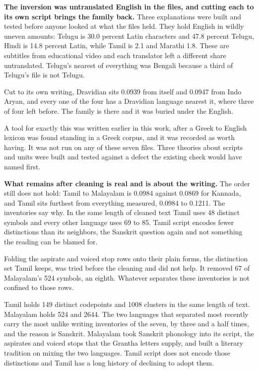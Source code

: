 \textbf{The inversion was untranslated English in the files, and cutting each to its own script brings the family back.} Three explanations were built and tested before anyone looked at what the files held. They hold English in wildly uneven amounts: Telugu is 30.0 percent Latin characters and 47.8 percent Telugu, Hindi is 14.8 percent Latin, while Tamil is 2.1 and Marathi 1.8. These are subtitles from educational video and each translator left a different share untranslated. Telugu's nearest of everything was Bengali because a third of Telugu's file is not Telugu.

Cut to its own writing, Dravidian sits 0.0939 from itself and 0.0947 from Indo Aryan, and every one of the four has a Dravidian language nearest it, where three of four left before. The family is there and it was buried under the English.

A tool for exactly this was written earlier in this work, after a Greek to English lexicon was found standing in a Greek corpus, and it was recorded as worth having. It was not run on any of these seven files. Three theories about scripts and units were built and tested against a defect the existing check would have named first.

\textbf{What remains after cleaning is real and is about the writing.} The order still does not hold: Tamil to Malayalam is 0.0984 against 0.0869 for Kannada, and Tamil sits furthest from everything measured, 0.0984 to 0.1211. The inventories say why. In the same length of cleaned text Tamil uses 48 distinct symbols and every other language uses 69 to 85. Tamil script encodes fewer distinctions than its neighbors, the Sanskrit question again and not something the reading can be blamed for.

Folding the aspirate and voiced stop rows onto their plain forms, the distinction set Tamil keeps, was tried before the cleaning and did not help. It removed 67 of Malayalam's 524 symbols, an eighth. Whatever separates these inventories is not confined to those rows.

Tamil holds 149 distinct codepoints and 1008 clusters in the same length of text. Malayalam holds 524 and 2644. The two languages that separated most recently carry the most unlike writing inventories of the seven, by three and a half times, and the reason is Sanskrit. Malayalam took Sanskrit phonology into its script, the aspirates and voiced stops that the Grantha letters supply, and built a literary tradition on mixing the two languages. Tamil script does not encode those distinctions and Tamil has a long history of declining to adopt them.

